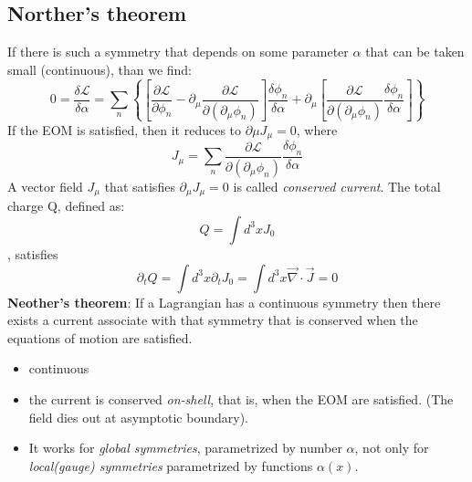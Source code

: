 \subsection{Norther's theorem}
If there is such a symmetry that depends on some parameter $\alpha$ that can
be taken small (continuous), than we find:
\[ 0 = \frac{\delta\mathcal{L}}{\delta\alpha} =
\displaystyle\sum_n\left\{ \left[\frac{\partial\mathcal{L}}{\partial{\phi_n}} - 
\partial_\mu\frac{\partial\mathcal{L}}{\partial(\partial_\mu\phi_n)}\right]\frac{\delta\phi_n}{\delta\alpha} 
+
\partial_\mu\left[\frac{\partial\mathcal{L}}{\partial(\partial_\mu\phi_n)}\frac{\delta\phi_n}{\delta\alpha}\right]
\right\} \]
If the EOM is satisfied, then it reduces to $\partial\mu J_\mu = 0$, where 
\begin{equation}
    \label{Norther current}
    J_\mu =
    \displaystyle\sum_n\frac{\partial\mathcal{L}}{\partial(\partial_\mu\phi_n)}\frac{\delta\phi_n}{\delta\alpha}
\end{equation}
A vector field $J_\mu$ that satisfies $\partial_\mu J_\mu = 0$ is called
\emph{conserved current}. The total charge Q, defined as: 
\[ Q = \int d^3xJ_0 \],
satisfies 
\[ \partial_{t}Q = \int d^3x\partial_{t}J_0 = \int
d^3x\vec{\nabla}\cdot\vec{J} = 0 \]
\textbf{Neother's theorem}: If a Lagrangian has a continuous symmetry then
there exists a current associate with that symmetry that is conserved when
the equations of motion are satisfied.
\begin{itemize}
    \item continuous
    \item the current is conserved \textit{on-shell}, that is, when the EOM
	are satisfied. (The field dies out at asymptotic boundary).
    \item It works for \textit{global symmetries}, parametrized by number
	$\alpha$, not only for \textit{local(gauge) symmetries} parametrized
	by functions $\alpha(x)$.
\end{itemize}

